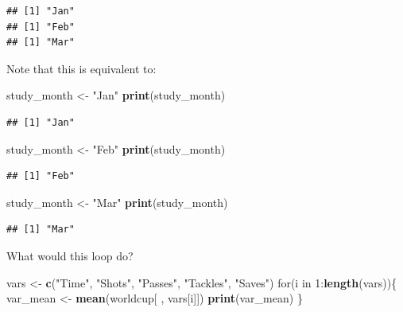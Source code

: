 \documentclass[]{book}
\makeatletter
\newenvironment{Shaded}{\begin{snugshade}}{\end{snugshade}}
\newcommand{\KeywordTok}[1]{\textcolor[rgb]{0.13,0.29,0.53}{\textbf{{#1}}}}
\newcommand{\DecValTok}[1]{\textcolor[rgb]{0.00,0.00,0.81}{{#1}}}
\newcommand{\StringTok}[1]{\textcolor[rgb]{0.31,0.60,0.02}{{#1}}}
\newcommand{\NormalTok}[1]{{#1}}
\newenvironment{kframe}{%
\medskip{}
\setlength{\fboxsep}{.8em}
 \def\at@end@of@kframe{}%
 \ifinner\ifhmode%
  \def\at@end@of@kframe{\end{minipage}}%
  \begin{minipage}{\columnwidth}%
 \fi\fi%
 \def\FrameCommand##1{\hskip\@totalleftmargin \hskip-\fboxsep
 \colorbox{shadecolor}{##1}\hskip-\fboxsep
     \hskip-\linewidth \hskip-\@totalleftmargin \hskip\columnwidth}%
 \MakeFramed {\advance\hsize-\width
   \@totalleftmargin\z@ \linewidth\hsize
   \@setminipage}}%
 {\par\unskip\endMakeFramed%
 \at@end@of@kframe}
\renewenvironment{Shaded}{\begin{kframe}}{\end{kframe}}
\makeatother
\begin{document}
\begin{verbatim}
## [1] "Jan"
## [1] "Feb"
## [1] "Mar"
\end{verbatim}

Note that this is equivalent to:

\begin{Shaded}
\begin{Highlighting}[]
\NormalTok{study_month <-}\StringTok{ "Jan"}
\KeywordTok{print}\NormalTok{(study_month)}
\end{Highlighting}
\end{Shaded}

\begin{verbatim}
## [1] "Jan"
\end{verbatim}

\begin{Shaded}
\begin{Highlighting}[]
\NormalTok{study_month <-}\StringTok{ "Feb"}
\KeywordTok{print}\NormalTok{(study_month)}
\end{Highlighting}
\end{Shaded}

\begin{verbatim}
## [1] "Feb"
\end{verbatim}

\begin{Shaded}
\begin{Highlighting}[]
\NormalTok{study_month <-}\StringTok{ "Mar"}
\KeywordTok{print}\NormalTok{(study_month)}
\end{Highlighting}
\end{Shaded}

\begin{verbatim}
## [1] "Mar"
\end{verbatim}

What would this loop do?

\begin{Shaded}
\begin{Highlighting}[]
\NormalTok{vars <-}\StringTok{ }\KeywordTok{c}\NormalTok{(}\StringTok{"Time"}\NormalTok{, }\StringTok{"Shots"}\NormalTok{, }\StringTok{"Passes"}\NormalTok{, }\StringTok{"Tackles"}\NormalTok{, }\StringTok{"Saves"}\NormalTok{)}
\NormalTok{for(i in }\DecValTok{1}\NormalTok{:}\KeywordTok{length}\NormalTok{(vars))\{}
        \NormalTok{var_mean <-}\StringTok{ }\KeywordTok{mean}\NormalTok{(worldcup[ , vars[i]])}
        \KeywordTok{print}\NormalTok{(var_mean)}
\NormalTok{\}}
\end{Highlighting}
\end{Shaded}
\end{document}
